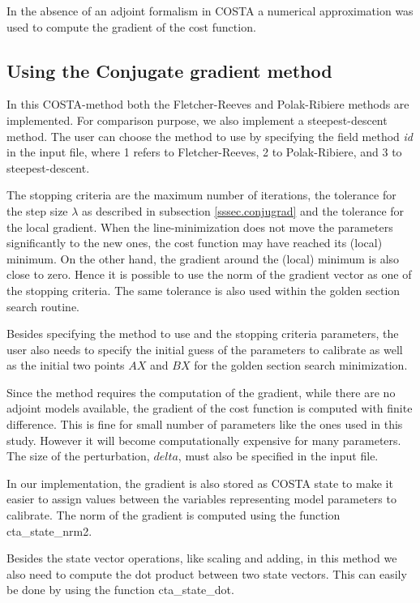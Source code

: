 In the absence of an adjoint formalism in COSTA a numerical approximation
was used to compute the gradient of the cost function.


\subsection{Using the Conjugate gradient method}
In this COSTA-method both the Fletcher-Reeves and Polak-Ribiere methods are
implemented. For comparison purpose, we also implement a steepest-descent
method. The user can choose the method to use by specifying the field
method \emph{id} in the input file, where 1 refers to Fletcher-Reeves, 2 to
Polak-Ribiere, and 3 to steepest-descent.

The stopping criteria are the maximum number of iterations, the tolerance
for the step size $\lambda$ as described in subsection
\ref{sssec.conjugrad} and the tolerance for the local gradient. When the
line-minimization does not move the parameters significantly to the new
ones, the cost function may have reached its (local) minimum. On the other
hand, the gradient around the (local) minimum is also close to zero. Hence
it is possible to use the norm of the gradient vector as one of the
stopping criteria. The same tolerance is also used within the golden
section search routine.

Besides specifying the method to use and the stopping criteria parameters,
the user also needs to specify the initial guess of the parameters to
calibrate as well as the initial two points $AX$ and $BX$ for the golden
section search minimization.

Since the method requires the computation of the gradient, while there are no
adjoint models available, the gradient of the cost function is computed
with finite difference. This is fine for small number of parameters like
the ones used in this study. However it will become computationally
expensive for many parameters. The size of the perturbation, $delta$, must
also be specified in the input file.

In our implementation, the gradient is also stored as COSTA state to make
it easier to assign values between the variables representing model
parameters to calibrate. The norm of the gradient is computed using the
function cta\_state\_nrm2.

Besides the state vector operations, like scaling and adding, in this
method we also need to compute the dot product between two state vectors.
This can easily be done by using the function cta\_state\_dot.


